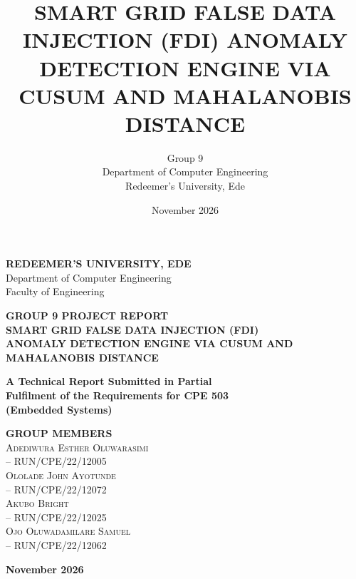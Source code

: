 \documentclass[12pt,a4paper]{report}
\title{\textbf{SMART GRID FALSE DATA INJECTION (FDI) ANOMALY DETECTION ENGINE VIA CUSUM AND MAHALANOBIS DISTANCE}}
\author{Group 9\\Department of Computer Engineering\\Redeemer's University, Ede}
\date{November 2026}
\begin{document}
\begin{titlepage}
\centering
\vspace*{1cm}
{\Large\textbf{REDEEMER'S UNIVERSITY, EDE}}\\[0.4cm]
{\large Department of Computer Engineering}\\
{\large Faculty of Engineering}

\vspace{1.5cm}
{\Large\textbf{GROUP 9 PROJECT REPORT}}\\[1cm]

{\LARGE\textbf{
SMART GRID FALSE DATA INJECTION (FDI)\\
ANOMALY DETECTION ENGINE VIA CUSUM AND\\
MAHALANOBIS DISTANCE
}}

\vspace{1.5cm}
\textbf{A Technical Report Submitted in Partial\\
Fulfilment of the Requirements for CPE 503\\
(Embedded Systems)}

\vspace{1.5cm}
\textbf{GROUP MEMBERS}\\[0.5cm]

\textsc{Adediwura Esther Oluwarasimi}\\
-- RUN/CPE/22/12005\\[0.3cm]

\textsc{Ololade John Ayotunde}\\
-- RUN/CPE/22/12072\\[0.3cm]

\textsc{Akubo Bright}\\
-- RUN/CPE/22/12025\\[0.3cm]

\textsc{Ojo Oluwadamilare Samuel}\\
-- RUN/CPE/22/12062

\vfill
\textbf{November 2026}
\end{titlepage}

\end{document}

